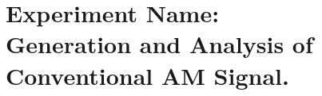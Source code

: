 \documentclass[12pt]{report}
\begin{document}


\tableofcontents
\newpage
\section*{Experiment Name: \\ Generation and Analysis of Conventional AM Signal.}














\end{document}
